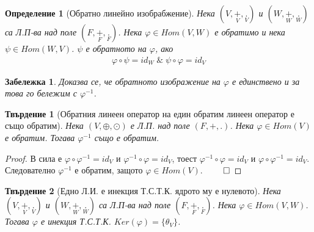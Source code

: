 \documentclass[12pt]{article}
\newtheorem{remark}{{Забележка}}%
\newtheorem{proposition}{Твърдение}%
\newtheorem{definition}{Определение}%
\begin{document}
\begin{definition}[Обратно линейно изобрабжение]
Нека \((V, \underset{V}{+}, \underset{V}{.})\) и \((W, \underset{W}{+}, \underset{W}{.})\) са Л.П-ва над поле \((F, \underset{F}{+}, \underset{F}{.})\).
Нека \(\varphi \in Hom(V, W)\) е обратимо и нека \(\psi \in Hom(W, V)\).
\(\psi\) е обратното на \(\varphi\), ако
\begin{align*}
\varphi \circ \psi = id_W \; \& \; \psi \circ \varphi = id_V
\end{align*}
\end{definition}

\begin{remark}
Доказва се, че обратното изображение на \(\varphi\) е единствено и за това го бележим с \(\varphi^{-1}\).
\end{remark}

\begin{proposition}[Обратния линеен оператор на един обратим линеен оператор е също обратим]
Нека \((V, \oplus, \odot)\) е Л.П. над поле \((F, +, .)\).
Нека \(\varphi \in Hom(V)\) е обратим.
Тогава \(\varphi^{-1}\) също е обратим.
\end{proposition}

\begin{proof}
В сила е \(\varphi \circ \varphi^{-1} = id_V\) и \(\varphi^{-1} \circ \varphi = id_V\),
тоест \(\varphi^{-1} \circ \varphi = id_V\) и \(\varphi \circ \varphi^{-1} = id_V\).
Следователно \(\varphi^{-1}\) е обратим, защото \(\varphi \in Hom(V)\). \(\qed\)
\end{proof}

\begin{proposition}[Едно Л.И. е инекция Т.С.Т.К. ядрото му е нулевото]
Нека \((V, \underset{V}{+}, \underset{V}{.})\) и \((W, \underset{W}{+}, \underset{W}{.})\) са Л.П-ва над поле \((F, \underset{F}{+}, \underset{F}{.})\).
Нека \(\varphi \in Hom(V, W)\). Тогава
\(\varphi\) е инекция Т.С.Т.К. \(Ker(\varphi) = \{\theta_V\}\).
\end{proposition}
\end{document}

